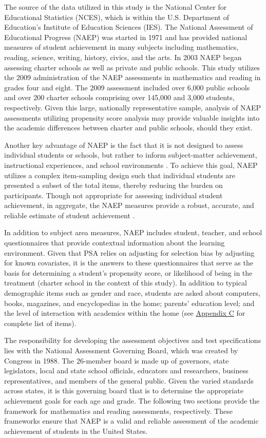 \documentclass[letterpaper,12pt]{article} %
\begin{document}
The source of the data utilized in this study is the National Center for Educational Statistics (NCES), which is within the U.S. Department of Education's Institute of Education Sciences (IES). The National Assessment of Educational Progress (NAEP) was started in 1971 and has provided national measures of student achievement in many subjects including mathematics, reading, science, writing, history, civics, and the arts. In 2003 NAEP began assessing charter schools as well as private and public schools. This study utilizes the 2009 administration of the NAEP assessments in mathematics and reading in grades four and eight. The 2009 assessment included over 6,000 public schools and over 200 charter schools comprising over 145,000 and 3,000 students, respectively. Given this large, nationally representative sample, analysis of NAEP assessments utilizing propensity score analysis may provide valuable insights into the academic differences between charter and public schools, should they exist.

Another key advantage of NAEP is the fact that it is not designed to assess individual students or schools, but rather to inform subject-matter achievement, instructional experiences, and school environments \cite{BraunJenkinsGrigg2006}. To achieve this goal, NAEP utilizes a complex item-sampling design such that individual students are presented a subset of the total items, thereby reducing the burden on participants. Though not appropriate for assessing individual student achievement, in aggregate, the NAEP measures provide a robust, accurate, and reliable estimate of student achievement \cite{DeptOfEd2009}.

In addition to subject area measures, NAEP includes student, teacher, and school questionnaires that provide contextual information about the learning environment. Given that PSA relies on adjusting for selection bias by adjusting for known covariates, it is the answers to these questionnaires that serve as the basis for determining a student's propensity score, or likelihood of being in the treatment (charter school in the context of this study). In addition to typical demographic items such as gender and race, students are asked about computers, books, magazines, and encyclopedias in the home; parents' education level; and the level of interaction with academics within the home (see \hyperref[appendixC]{Appendix C} for complete list of items).

The responsibility for developing the assessment objectives and test specifications lies with the National Assessment Governing Board, which was created by Congress in 1988. The 26-member board is made up of governors, state legislators, local and state school officials, educators and researchers, business representatives, and members of the general public. Given the varied standards across states, it is this governing board that is to determine the appropriate achievement goals for each age and grade. The following two sections provide the framework for mathematics and reading assessments, respectively. These frameworks ensure that NAEP is a valid and reliable assessment of the academic achievement of students in the United States.
\end{document}
